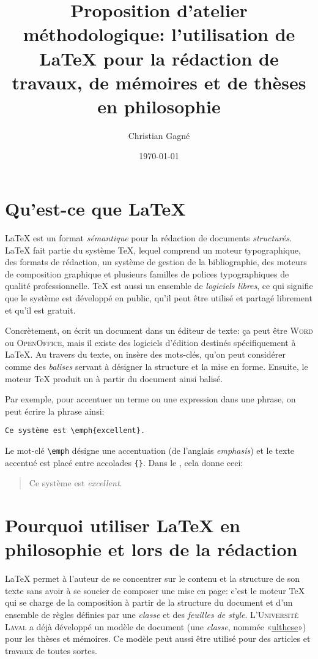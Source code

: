 \documentclass{article}
\title{Proposition d’atelier méthodologique: l’utilisation de \LaTeX{} pour la rédaction de travaux, de mémoires et de thèses en philosophie}
\author{Christian Gagné}
\date{\today}
\begin{document}
\maketitle

\section{Qu’est-ce que \LaTeX{}}

\LaTeX{} est un format \emph{sémantique} pour la rédaction de documents \emph{structurés}. \LaTeX{} fait partie du système \TeX{}, lequel comprend un moteur typographique, des formats de rédaction, un système de gestion de la bibliographie, des moteurs de composition graphique et plusieurs familles de polices typographiques de qualité professionnelle. \TeX{} est aussi un ensemble de \emph{logiciels libres}, ce qui signifie que le système est développé en public, qu’il peut être utilisé et partagé librement et qu’il est gratuit.

Concrètement, on écrit un document dans un éditeur de texte: ça peut être \textsc{Word} ou \textsc{OpenOffice}, mais il existe des logiciels d’édition destinés spécifiquement à \LaTeX{}. Au travers du texte, on insère des mots-clés, qu’on peut considérer comme des \emph{balises} servant à désigner la structure et la mise en forme. Ensuite, le moteur \TeX{} produit un  à partir du document ainsi balisé.

Par exemple, pour accentuer un terme ou une expression dans une phrase, on peut écrire la phrase ainsi:

\begin{verbatim}
Ce système est \emph{excellent}.
\end{verbatim}

Le mot-clé \verb$\emph$ désigne une accentuation (de l’anglais \emph{emphasis}) et le texte accentué est placé entre accolades \verb${}$. Dans le , cela donne ceci:

\begin{quote}
Ce système est \emph{excellent}.
\end{quote}

\section{Pourquoi utiliser \LaTeX{} en philosophie et lors de la rédaction}

\LaTeX{} permet à l’auteur de se concentrer sur le contenu et la structure de son texte sans avoir à se soucier de composer une mise en page: c’est le moteur \TeX{} qui se charge de la composition à partir de la structure du document et d’un ensemble de règles définies par une \emph{classe} et des \emph{feuilles de style}. L’\textsc{Université Laval} a déjà développé un modèle de document (une \emph{classe}, nommée «\href{http://ctan.org/pkg/ulthese}{ulthese}») pour les thèses et mémoires. Ce modèle peut aussi être utilisé pour des articles et travaux de toutes sortes.
\end{document}
